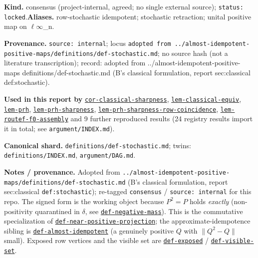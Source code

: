 \begin{defnote}
\textbf{Kind.} consensus (project-internal, agreed; no single external source); \texttt{status: locked}.\quad\textbf{Aliases.} row-stochastic idempotent; stochastic retraction; unital positive map on $\ell\infty$\_n.
\par
\textbf{Provenance.} \texttt{source: internal}; locus \texttt{adopted from ..\allowbreak{}/\allowbreak{}almost-\allowbreak{}idempotent-\allowbreak{}positive-\allowbreak{}maps/\allowbreak{}definitions/\allowbreak{}def-\allowbreak{}stochastic.\allowbreak{}md}; no source hash (not a literature transcription); record: adopted from ..\allowbreak{}/\allowbreak{}almost-\allowbreak{}idempotent-\allowbreak{}positive-\allowbreak{}maps definitions/\allowbreak{}def-\allowbreak{}stochastic.\allowbreak{}md (B's classical formulation,\allowbreak{} report sec:\allowbreak{}classical def:\allowbreak{}stochastic).
\par
\textbf{Used in this report by} \hyperref[cor:classical-sharpness]{\texttt{cor-\allowbreak{}classical-\allowbreak{}sharpness}}, \hyperref[lem:classical-equiv]{\texttt{lem-\allowbreak{}classical-\allowbreak{}equiv}}, \hyperref[lem:prh]{\texttt{lem-\allowbreak{}prh}}, \hyperref[lem:prh-sharpness]{\texttt{lem-\allowbreak{}prh-\allowbreak{}sharpness}}, \hyperref[lem:prh-sharpness-row-coincidence]{\texttt{lem-\allowbreak{}prh-\allowbreak{}sharpness-\allowbreak{}row-\allowbreak{}coincidence}}, \hyperref[lem:routef-f0-assembly]{\texttt{lem-\allowbreak{}routef-\allowbreak{}f0-\allowbreak{}assembly}} and 9 further reproduced results (24 registry results import it in total; see \texttt{argument/INDEX.md}).
\par
\textbf{Canonical shard.} \texttt{definitions/\allowbreak{}def-\allowbreak{}stochastic.\allowbreak{}md}; twins: \texttt{definitions/INDEX.md}, \texttt{argument/DAG.md}.
\par
\textbf{Notes / provenance.} Adopted from \texttt{..\allowbreak{}/\allowbreak{}almost-\allowbreak{}idempotent-\allowbreak{}positive-\allowbreak{}maps/\allowbreak{}definitions/\allowbreak{}def-\allowbreak{}stochastic.\allowbreak{}md}
(B's classical formulation, report sec:classical \texttt{def:\allowbreak{}stochastic}); re-tagged \texttt{consensus} /
\texttt{source:\allowbreak{} internal} for this repo. The signed form is the working object because $P^2=P$ holds \emph{exactly}
(non-positivity quarantined in $\delta$, see \hyperref[def:negative-mass]{\texttt{def-\allowbreak{}negative-\allowbreak{}mass}}). This is the commutative
specialization of \hyperref[def:near-positive-projection]{\texttt{def-\allowbreak{}near-\allowbreak{}positive-\allowbreak{}projection}}; the approximate-idempotence sibling is
\hyperref[def:almost-idempotent]{\texttt{def-\allowbreak{}almost-\allowbreak{}idempotent}} (a genuinely positive $Q$ with $\lVert Q^2-Q\rVert$ small). Exposed row
vertices and the visible set are \hyperref[def:exposed]{\texttt{def-\allowbreak{}exposed}} / \hyperref[def:visible-set]{\texttt{def-\allowbreak{}visible-\allowbreak{}set}}.
\end{defnote}

